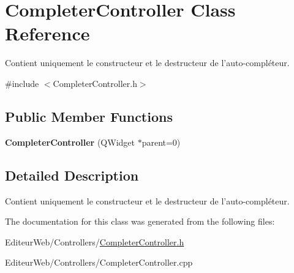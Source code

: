 \hypertarget{class_completer_controller}{
\section{CompleterController Class Reference}
\label{class_completer_controller}
}


Contient uniquement le constructeur et le destructeur de l'auto-\/compléteur.  




{\ttfamily \#include $<$CompleterController.h$>$}

\subsection*{Public Member Functions}
\begin{DoxyCompactItemize}
\item 
\hypertarget{class_completer_controller_a7fcc34d305e83322b80875652126354d}{
{\bfseries CompleterController} (QWidget $\ast$parent=0)}
\label{class_completer_controller_a7fcc34d305e83322b80875652126354d}

\end{DoxyCompactItemize}


\subsection{Detailed Description}
Contient uniquement le constructeur et le destructeur de l'auto-\/compléteur. 

The documentation for this class was generated from the following files:\begin{DoxyCompactItemize}
\item 
EditeurWeb/Controllers/\hyperlink{_completer_controller_8h}{CompleterController.h}\item 
EditeurWeb/Controllers/CompleterController.cpp\end{DoxyCompactItemize}
